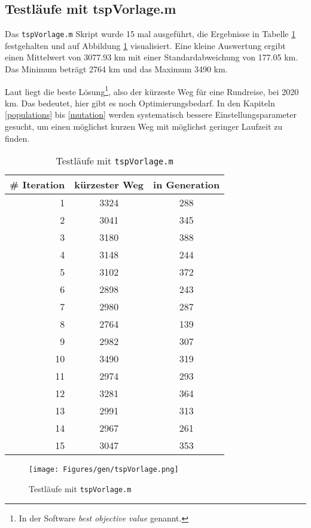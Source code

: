 \subsection{Testläufe mit tspVorlage.m}

Das {\tt tspVorlage.m} Skript wurde 15 mal ausgeführt, die Ergebnisse in
Tabelle \ref{testlaeufe} festgehalten und auf Abbildung \ref{fig.testlaeufe}
visualisiert.
Eine kleine Auswertung ergibt einen Mittelwert von 3077.93 km mit
einer Standardabweichung von 177.05 km.
Das Minimum beträgt 2764 km und das Maximum 3490 km.

Laut \cite{aufg} liegt die beste
Lösung\footnote{In der Software \emph{best objective value} genannt.},
also der kürzeste Weg für eine Rundreise, bei 2020 km.
Das bedeutet, hier gibt es noch Optimierungsbedarf.
In den Kapiteln \ref{populations} bis \ref{mutation} werden systematisch bessere Einstellungsparameter
gesucht, um einen möglichst kurzen Weg mit möglichst geringer Laufzeit zu finden.

\begin{table}[h]
\begin{tabular}{ | r | c | c | }
  \hline
  \# Iteration & kürzester Weg & in Generation \\
  \hline
  1  & 3324 & 288 \\
  2  & 3041 & 345 \\
  3  & 3180 & 388 \\
  4  & 3148 & 244 \\
  5  & 3102 & 372 \\
  6  & 2898 & 243 \\
  7  & 2980 & 287 \\
  8  & 2764 & 139 \\
  9  & 2982 & 307 \\
  10 & 3490 & 319 \\
  11 & 2974 & 293 \\
  12 & 3281 & 364 \\
  13 & 2991 & 313 \\
  14 & 2967 & 261 \\
  15 & 3047 & 353 \\
  \hline
\end{tabular}
\caption{Testläufe mit {\tt tspVorlage.m}}\label{testlaeufe}
\end{table}

\begin{figure}[h!]
  \centering
  \texttt{[image: Figures/gen/tspVorlage.png]}
  \caption{Testläufe mit {\tt tspVorlage.m}}\label{fig.testlaeufe}
\end{figure}


